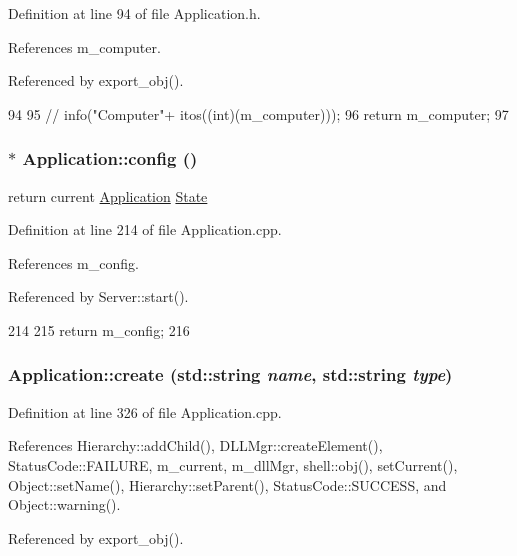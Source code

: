 Definition at line 94 of file Application.h.

References m\_\-computer.

Referenced by export\_\-obj().


\begin{DoxyCode}
94                         {
95     //    info("Computer"+ itos((int)(m_computer)));
96     return m_computer;
97   }
\end{DoxyCode}
\hypertarget{classApplication_ae79819f7743d6f402fce87665c1dc9a6}{
\subsubsection[{config}]{ $\ast$ Application::config ()}}
\label{classApplication_ae79819f7743d6f402fce87665c1dc9a6}
return current \hyperlink{classApplication}{Application} \hyperlink{classState}{State} 

Definition at line 214 of file Application.cpp.

References m\_\-config.

Referenced by Server::start().


\begin{DoxyCode}
214                               {
215   return m_config;
216 }
\end{DoxyCode}
\hypertarget{classApplication_a552c6df459660f2d80e6d0ac6ce8279b}{
\subsubsection[{create}]{ Application::create (std::string {\em name}, \/  std::string {\em type})}}
\label{classApplication_a552c6df459660f2d80e6d0ac6ce8279b}


Definition at line 326 of file Application.cpp.

References Hierarchy::addChild(), DLLMgr::createElement(), StatusCode::FAILURE, m\_\-current, m\_\-dllMgr, shell::obj(), setCurrent(), Object::setName(), Hierarchy::setParent(), StatusCode::SUCCESS, and Object::warning().

Referenced by export\_\-obj().


